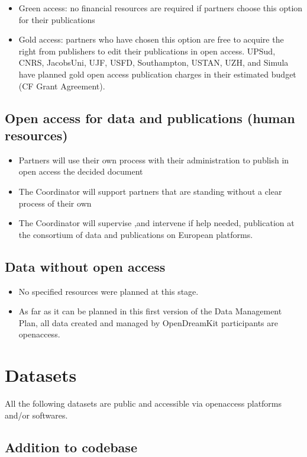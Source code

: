 \documentclass{deliverablereport}
\begin{document}
\begin{itemize}
\item{}Green access: no financial resources are required if partners choose this option for their publications
\item{}Gold access: partners who have chosen this option are free to acquire the right from publishers to edit their publications in open access.
UPSud, CNRS, JacobsUni, UJF, USFD, Southampton, USTAN, UZH, and Simula have planned gold open access publication charges in their estimated budget (CF Grant Agreement).
\end{itemize}

\subsection{Open access for data and publications (human resources)}


\begin{itemize}
\item{}Partners will use their own process with their administration to publish in open access the decided document
\item{}The Coordinator will support partners that are standing without a clear process of their own
\item{}The Coordinator will supervise ,and intervene if help needed, publication at the consortium of data and publications on European platforms.
\end{itemize}


\subsection{Data without open access}
\begin{itemize}
\item{}No specified resources were planned at this stage.
\item{}As far as it can be planned in this first version of the Data Management Plan, all data created and managed by OpenDreamKit participants are openaccess.
\end{itemize}
\newpage
\section{Datasets}
All the following datasets are public and accessible via openaccess platforms and/or softwares.


\subsection{Addition to \Sage codebase}
\end{document}
